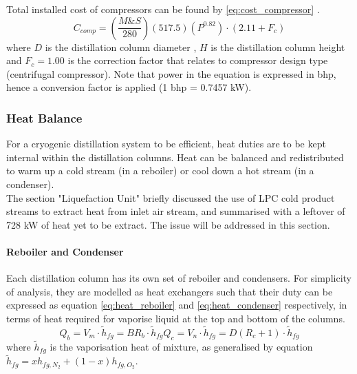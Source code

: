 \documentclass[11pt,oneside]{article}
\let\subsubsubsection\paragraph
\begin{document}
	\noindent Total installed cost of compressors can be found by \ref{eq:cost_compressor} \citep{douglas1988}. 
	\begin{equation}
	    C_{comp} = \left(\frac{M\&S}{280}\right)\left(517.5\right)\left(P^{0.82}\right)\cdot \left(2.11 + F_c\right)
	    \label{eq:cost_compressor}
	\end{equation}
	where $D$ is the distillation column diameter , $H$ is the distillation column height and $F_c = 1.00$ is the correction factor that relates to compressor design type (centrifugal compressor). Note that power in the equation is expressed in bhp, hence a conversion factor is applied (1 bhp = 0.7457 kW).
	\subsubsection{Heat Balance} \noindent \noindent
    For a cryogenic distillation system to be efficient, heat duties are to be kept internal within the distillation columns. Heat can be balanced and redistributed to warm up a cold stream (in a reboiler) or cool down a hot stream (in a condenser). \\ 
    The section "Liquefaction Unit" briefly discussed the use of LPC cold product streams to extract heat from inlet air stream, and summarised with a leftover of 728 kW of heat yet to be extract. The issue will be addressed in this section.
    \subsubsubsection{Reboiler and Condenser}
        Each distillation column has its own set of reboiler and condensers. For simplicity of analysis, they are modelled as heat exchangers such that their duty can be expressed as equation \ref{eq:heat_reboiler} and \ref{eq:heat_condenser} respectively, in terms of heat required for vaporise liquid at the top and bottom of the columns.
        \begin{subequations}
            \begin{equation}
                Q_{b} = V_m \cdot \tilde{h}_{fg} = BR_b \cdot \tilde{h}_{fg}
                \label{eq:heat_reboiler}
            \end{equation}
            \begin{equation}
                Q_{c} = V_n \cdot \tilde{h}_{fg} = D(R_c+1) \cdot \tilde{h}_{fg}
                \label{eq:heat_condenser}
            \end{equation}
		\end{subequations}
		where $\tilde{h}_{fg}$ is the vaporisation heat of mixture, as generalised by equation $\tilde{h}_{fg} = xh_{fg,N_2} + (1-x)h_{fg,O_2}$. \\
		
\end{document}
